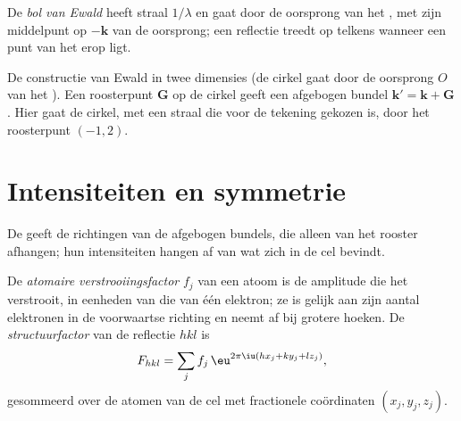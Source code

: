 \begin{definition}\label{def:b3:x-ray-diffraction:ewald}
De \emph{bol van Ewald} heeft straal $1/\lambda$ en gaat
door de oorsprong van het , met zijn middelpunt op $-\mathbf k$ van de oorsprong; een
reflectie treedt op telkens wanneer een punt van het 
erop ligt.
\end{definition}

\begin{omfigure}

{\small De constructie van Ewald in twee dimensies (de cirkel gaat door de
oorsprong $O$ van het ). Een roosterpunt $\mathbf G$ op de
cirkel geeft een
afgebogen bundel $\mathbf k' = \mathbf k + \mathbf G$. Hier gaat de cirkel,
met een straal die voor de tekening gekozen is, door het roosterpunt $(-1, 2)$.}
\end{omfigure}

\section{Intensiteiten en symmetrie}

De  geeft de richtingen van de afgebogen bundels, die alleen
van het rooster afhangen; hun intensiteiten hangen af van wat zich in de
cel bevindt.

\begin{definition}\label{def:b3:x-ray-diffraction:structure-factor}
De \emph{atomaire verstrooiingsfactor}
$f_j$ van een atoom is de amplitude die het verstrooit, in eenheden van
die van één elektron; ze is gelijk aan zijn aantal elektronen in de
voorwaartse richting en neemt af bij grotere hoeken. De
\emph{structuurfactor} van de reflectie $hkl$ is
\[
F_{hkl} = \sum_jf_j\,\eu^{2\pi\iu(hx_j + ky_j + lz_j)},
\]
gesommeerd over de atomen van de cel met fractionele coördinaten $(x_j, y_j, z_j)$.
\end{definition}

